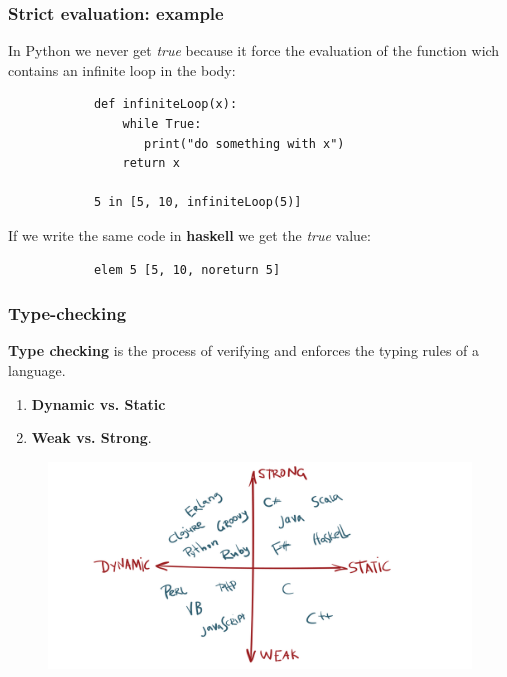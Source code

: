 \documentclass[xcolor ={table,usenames,dvipsnames}]{beamer}
\theoremstyle{definition}
\begin{document}
	\begin{frame}[fragile]
		\frametitle{Strict evaluation: example}
		In Python we never get \textit{true} because  it force the evaluation of the function wich contains an infinite loop in the body:
		\begin{lstlisting}
			def infiniteLoop(x):
			    while True:
		           print("do something with x")
		        return x
				
			5 in [5, 10, infiniteLoop(5)]
		\end{lstlisting}
		If we write the same code in \textbf{haskell} we get the \textit{true} value:
		\begin{lstlisting}
			elem 5 [5, 10, noreturn 5]
		\end{lstlisting}
	\end{frame}

	\begin{frame}
		\frametitle{Type-checking }
			\textbf{Type checking} is the process of verifying and enforces the typing rules of a language.
		\begin{enumerate}
			\item \textbf{Dynamic vs. Static}
			\item \textbf{Weak vs. Strong}.
		\end{enumerate}
		\begin{figure}[h!]
			\centering
			\includegraphics[scale=0.14]{img/classification.png}
		\end{figure}
	\end{frame}
\end{document}
